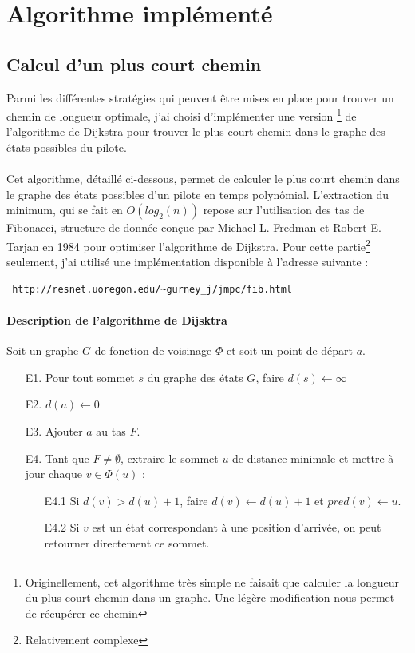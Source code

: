 \documentclass[a4paper,10pt]{article}
\begin{document}
\section{Algorithme implémenté}
\subsection{Calcul d'un plus court chemin}
Parmi les différentes stratégies qui peuvent être mises en place pour trouver un chemin de longueur optimale, j'ai choisi d'implémenter une version
\footnote{Originellement, cet algorithme très simple ne faisait que calculer la longueur du plus court chemin dans un graphe. Une légère modification nous permet de récupérer ce chemin}
de l'algorithme de Dijkstra pour trouver le plus court chemin dans le graphe des états possibles du pilote.
\\
\\
Cet algorithme, détaillé ci-dessous, permet de calculer le plus court chemin dans le graphe des états possibles d'un pilote en temps polynômial.
L'extraction du minimum, qui se fait en $O(log_{2}(n))$ repose sur l'utilisation des tas de Fibonacci, structure de donnée conçue par Michael L. Fredman et Robert E. Tarjan en 1984 pour optimiser l'algorithme de Dijkstra.
Pour cette partie\footnote{Relativement complexe} seulement, j'ai utilisé une implémentation disponible à l'adresse suivante :
\begin{verbatim}
 http://resnet.uoregon.edu/~gurney_j/jmpc/fib.html
\end{verbatim}

\paragraph{Description de l'algorithme de Dijsktra}

Soit un graphe $G$ de fonction de voisinage $\Phi$ et soit un point de départ $a$.

\begin{itemize}
 \item [E1.] Pour tout sommet $s$ du graphe des états $G$, faire $d(s)\leftarrow\infty$
 \item [E2.] $d(a)\leftarrow 0$
 \item[E3.] Ajouter $a$ au tas $F$.
 \item[E4.] Tant que $F\neq\emptyset$, extraire le sommet $u$ de distance minimale et mettre à jour chaque $v\in\Phi(u)$ :
 \begin{itemize}
  \item [E4.1] Si $d(v)>d(u)+1$, faire $d(v)\leftarrow d(u)+1$ et $pred(v)\leftarrow u$.
  \item[E4.2] Si $v$ est un état correspondant à une position d'arrivée, on peut retourner directement ce sommet.
 \end{itemize}
\end{itemize}
\end{document}
